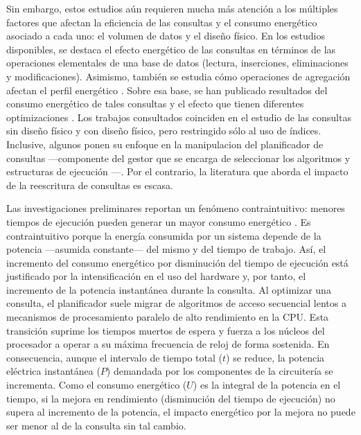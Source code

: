 \documentclass[12pt, letter paper]{report}
\begin{document}
  Sin embargo, estos estudios aún requieren mucha más atención a los múltiples
  factores que afectan la eficiencia de las consultas y el consumo energético
  asociado a cada uno: el volumen de datos y el diseño físico. En los estudios
  disponibles, se destaca el efecto energético de las consultas en términos de
  las operaciones elementales de una base de datos (lectura, inserciones,
  eliminaciones y modificaciones). Asimismo, también se estudia cómo operaciones
  de agregación afectan el perfil energético \cite{niemannevaluating2013,
  duarteevaluating2018}. Sobre esa base, se han publicado resultados del consumo
  energético de tales consultas y el efecto que tienen diferentes optimizaciones
  \cite{langrethinking2011, duarteevaluating2018, pisharathreducing2004,
  macdonaldefficient2017, mahajanenergy2017, mahajanimproving2019}. Los trabajos
  consultados coinciden en el estudio de las consultas sin diseño físico y con
  diseño físico, pero restringido sólo al uso de índices. Inclusive, algunos
  \cite{bingleiguosql2015} ponen su enfoque en la manipulacion del planificador
  de consultas ---componente del gestor que se encarga de seleccionar los
  algoritmos y estructuras de ejecución \cite{silberschatz2019database,
  elmasri2016fundamentals, connolly2014database, ramakrishnan2003database}---.
  Por el contrario, la literatura que aborda el impacto de la reescritura de
  consultas es escasa.

  Las investigaciones preliminares reportan un fenómeno contraintuitivo: menores
  tiempos de ejecución pueden generar un mayor consumo energético
  \cite{bingleiguosql2015, guoenergy-efficient2023, bunseexploring2009,
  hopfnertowards2009}. Es contraintuitivo porque la energía consumida por un
  sistema depende de la potencia ---asumida constante--- del mismo y del tiempo
  de trabajo. Así, el incremento del consumo energético por disminución del
  tiempo de ejecución está justificado por la intensificación en el uso del
  hardware y, por tanto, el incremento de la potencia instantánea durante la
  consulta. Al optimizar una consulta, el planificador suele migrar de
  algoritmos de acceso secuencial lentos a mecanismos de procesamiento paralelo
  de alto rendimiento en la CPU. Esta transición suprime los tiempos muertos de
  espera y fuerza a los núcleos del procesador a operar a su máxima frecuencia
  de reloj de forma sostenida. En consecuencia, aunque el intervalo de tiempo
  total ($t$) se reduce, la potencia eléctrica instantánea ($P$) demandada por
  los componentes de la circuitería se incrementa. Como el consumo energético
  ($U$) es la integral de la potencia en el tiempo, si la mejora en rendimiento
  (disminución del tiempo de ejecución) no supera al incremento de la potencia,
  el impacto energético por la mejora no puede ser menor al de la consulta sin
  tal cambio.
\end{document}

